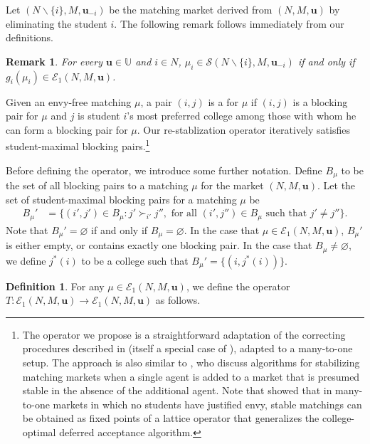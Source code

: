 \documentclass[12pt, fullpage]{amsart}
\newtheorem{remark}{Remark}[section]
\theoremstyle{definition}
\newtheorem{definition}{Definition}[section]
\theoremstyle{definition}
\theoremstyle{definition}
\begin{document}
\begin{bibunit}[econometrica]
Let $(N\backslash\{i\},M,\boldsymbol{u}_{-i})$ be the matching market derived from $(N,M,\boldsymbol{u})$ by eliminating the student $i$. The following remark follows immediately from our definitions. 
\begin{remark}\label{student_optimal_one_envy_free} For every $\boldsymbol{u}\in\mathbb{U}$ and $i\in N$, \label{rem}$\mu_{i} \in\mathcal{S}(N\backslash\{i\},M,\boldsymbol{u}_{-i})$
	if and only if $g_i(\mu_i)\in\mathcal{E}_1(N,M,\boldsymbol{u})$.  
\end{remark}

Given an envy-free matching $\mu$, a pair $(i,j)$ is a  for $\mu$ if $(i,j)$ is a blocking pair for $\mu$ and $j$ is student $i$'s most preferred college among those with whom he can form a blocking pair for $\mu$. Our re-stablization operator iteratively satisfies student-maximal blocking pairs.\footnote{The operator we propose is a straightforward adaptation of the correcting procedures described in \citet{Blum/Rothblum/2002} (itself a special case of   \cite{Blum/Roth/Rothblum:1997:JET}), adapted to a many-to-one setup. The approach is also similar to \citet{Biro/Cechlarova/Fleiner:208:IJGT}, who discuss algorithms for stabilizing matching markets when a single agent is added to a market that is presumed stable in the absence of the
	additional agent. Note that \cite{Wu/Roth:2018:GEB} showed that in many-to-one markets in which no students have justified envy, stable matchings can be obtained as fixed points of a lattice operator that generalizes the college-optimal deferred acceptance algorithm.} 

Before defining the operator, we introduce some further notation. Define $B_{\mu}$ to be the set of all blocking pairs to a matching $\mu$ for the market $(N,M,\boldsymbol{u})$. Let the set of student-maximal blocking pairs for a matching $\mu$ be
\begin{align*}
	B_{\mu}' & =\{(i',j')\in B_{\mu}:j'\succ_{i'}j'',\text{ for all }(i',j'')\in B_{\mu} \text{ such that } j' \ne j''\}.
\end{align*}
Note that $B_{\mu}' = \varnothing$ if and only if $B_{\mu} = \varnothing$. In the case that $\mu\in\mathcal{E}_1(N,M,\boldsymbol{u})$, $B_{\mu}'$ is either empty, or contains exactly one blocking pair. In the case that  $B_{\mu}\neq\varnothing$, we define $j^{*}(i)$ to be a college such that $B_{\mu}' = \{(i,j^{*}(i))\}$.

\begin{definition}\label{T} 
	For any $\mu\in \mathcal{E}_1(N,M,\boldsymbol{u})$, we define the operator $T: \mathcal{E}_1(N,M,\boldsymbol{u})\rightarrow \mathcal{E}_1(N,M,\boldsymbol{u})$ as follows.\medskip
	

\end{definition}
\end{bibunit}
\end{document}
